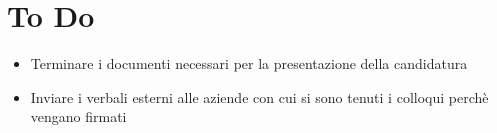 \documentclass[a4paper, 12pt]{article}
\begin{document}
\section{To Do}
\begin{itemize}
    \item Terminare i documenti necessari per la presentazione della candidatura
    \item Inviare i verbali esterni alle aziende con cui si sono tenuti i colloqui perchè vengano firmati
\end{itemize}
\end{document}
